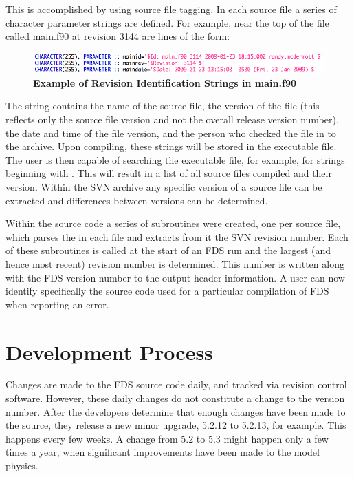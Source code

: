 \documentclass[11pt]{book}
\begin{document}
This is accomplished by using source file tagging.  In each source file a series of character parameter
strings are defined.  For example, near the top of the file called main.f90 at revision 3144 are lines of the form:

\begin{figure}[ht!]
\includegraphics[width=\textwidth]{FIGURES/RevisionStrings}
\caption{\bf Example of Revision Identification Strings in main.f90}
\label{fig:revstrings}
\end{figure}

\noindent
The string contains the name of the source file, the version of the file (this reflects only the source
file version and not the overall release version number), the date and time of the file version, and
the person who checked the file in to the archive.  Upon compiling, these strings will be stored in the
executable file.  The user is then capable of searching the executable file, for example, for strings
beginning with .  This will result in a list of all source files compiled and their version.
Within the SVN archive any specific version of a source file can be extracted and differences between
versions can be determined.

Within the source code a series of subroutines were created, one per source file, which parses the  in
each file and extracts from it the SVN revision number.  Each of these subroutines is called at the start
of an FDS run and the largest (and hence most recent) revision number is determined.  This number is written
along with the FDS version number to the output header information.  A user can now identify specifically
the source code used for a particular compilation of FDS when reporting an error.




\clearpage
\section{Development Process}

Changes are made to the FDS source code daily, and tracked via revision control software. However, these daily changes do not constitute a change to
the version number. After the developers determine that enough changes have been made to the source, they release a new minor upgrade, 5.2.12 to
5.2.13, for example. This happens every few weeks. A change from 5.2 to 5.3 might happen only a few times a year, when significant improvements have
been made to the model physics.
\end{document}
